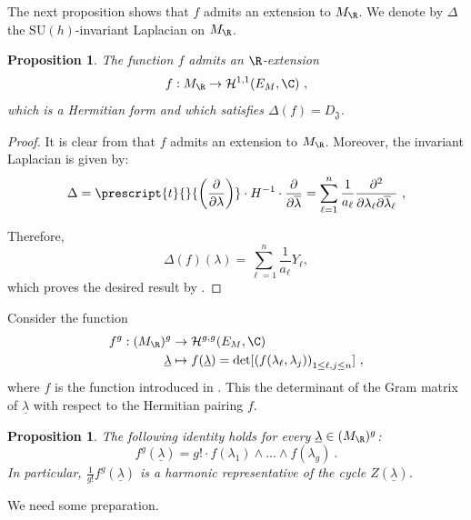 \documentclass[11pt,letterpaper,english]{amsart}
\numberwithin{equation}{subsection}
\numberwithin{equation}{section}
\newcommand\cO{{\mathcal O}}
\newcommand\fJ{{\mathfrak J}}
\theoremstyle{plain}
\newtheorem{proposition}[theorem]{Proposition}
\theoremstyle{remark}
\begin{document}
The next proposition shows that $f$  admits an extension to $M_\R$. We denote by $\Delta$ the $\mathrm{SU}(h)$-invariant Laplacian on $M_\R$. 
\begin{proposition}\label{p:quad-lift}
    The function $f$ admits an $\R$-extension 
    \[f:M_\R\rightarrow \mathcal{H}^{1,1}(E_M,\C)~,\]
    which is a Hermitian form and which satisfies $\Delta(f)=D_\fJ$.
\end{proposition}

\begin{proof}
 It is clear from  that $f$ admits an extension to $M_\R$. Moreover, the invariant Laplacian is given by: 
\[\Delta= \prescript{t}{}{\left(\frac{\partial}{\partial \lambda}\right)}\cdot H^{-1}\cdot \frac{\partial}{\partial \overline{\lambda}}=\sum_{\ell=1}^n\frac{1}{a_\ell}\frac{\partial^2}{\partial\lambda_\ell\partial\overline\lambda_\ell}~,\]
     

Therefore,    \[\Delta(f)(\lambda)=\sum_{\ell=1}^n\frac{1}{a_\ell}Y_\ell,\]
    which proves the desired result by . 
\end{proof}

Consider  the function 
\begin{align*}\label{equ:main-function}
f^g: (M_\R)^g&\rightarrow \mathcal{H}^{g,g}(E_M,\C)\\
    \underline{\lambda}&\mapsto f(\underline\lambda)=\det[\left(f(\lambda_\ell,\lambda_j)\right)_{1\leq \ell,j\leq n}]~,
\end{align*}
where $f$ is the function introduced in . This the determinant of the Gram matrix of $\underline{\lambda}$ with respect to the Hermitian pairing $f$.

\begin{proposition}\label{gram-rep}
The following identity holds for every $\underline \lambda\in (M_\R)^g$: 
\[f^g(\underline{\lambda})=g!\cdot f(\lambda_1)\wedge\ldots\wedge f(\lambda_g)~.\]
In particular, $\frac{1}{g!}f^g(\underline{\lambda})$ is a harmonic representative of the cycle $Z(\underline{\lambda})$.
\end{proposition}
We need some preparation. %
\end{document}
